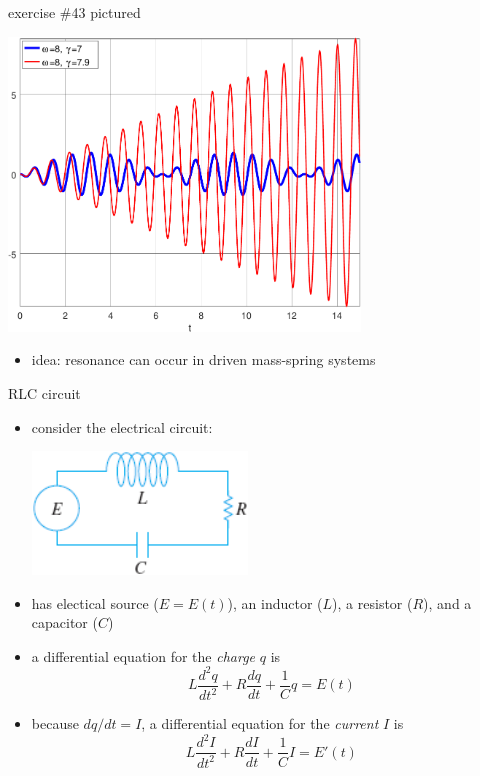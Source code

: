 \documentclass[urlcolor=blue,dvipsnames]{beamer}
\begin{document}
\begin{frame}{exercise \#43 pictured}

\begin{center}
\includegraphics[width=0.7\textwidth]{figs/resonance}
\end{center}

\begin{itemize}
\item idea: \alert{resonance} can occur in driven mass-spring systems
\end{itemize}
\end{frame}



\begin{frame}{RLC circuit}

\begin{itemize}
\item consider the electrical circuit:

\vspace{-3mm}
\hfill \includegraphics[width=0.45\textwidth]{figs/rlc-circuit}
\item has electical source ($E=E(t)$), an inductor ($L$), a resistor ($R$), and a capacitor ($C$)
\item a differential equation for the \emph{charge} $q$ is
    $$L \frac{d^2q}{dt^2} + R \frac{dq}{dt} + \frac{1}{C} q=E(t)$$
\item because $dq/dt = I$, a differential equation for the \emph{current} $I$ is
    $$L \frac{d^2I}{dt^2} + R \frac{dI}{dt} + \frac{1}{C} I=E'(t)$$
\end{itemize}
\end{frame}
\end{document}
